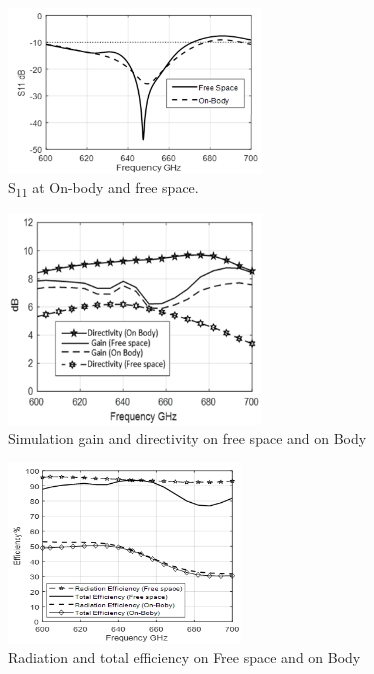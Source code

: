 \documentclass[12pt]{suhbook}
\begin{document}
\begin{figure}[hbt!]
    \centering
    \includegraphics[width=0.6\textwidth]{10}
    \caption{\si{S_{11}} at On-body and free space.}
    \label{Fig 8B}
\end{figure}
\begin{figure}[hbt!]
    \centering
    \includegraphics[width=0.6\textwidth]{11}
    \caption{Simulation gain and directivity on free space and on Body}
    \label{Fig 8AA}
\end{figure}
\begin{figure}[hbt!]
    \centering
    \includegraphics[width=0.55\textwidth]{12}
    \caption{Radiation and total efficiency on Free space and on Body}
    \label{Fig 91}
\end{figure}
\end{document}
